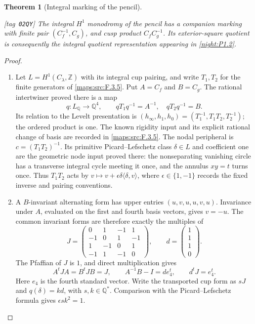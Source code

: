 \documentclass[11pt,a4paper]{article}
\numberwithin{equation}{section}
\newtheorem{theorem}{Theorem}[section]
\theoremstyle{definition}
\newcommand{\StatementRecord}[4]{{\upshape\footnotesize[tag~\texttt{#3}]}\enspace\ignorespaces}
\begin{document}
\begin{theorem}[Integral marking of the pencil]\hypertarget{tag-02QY}{}\label{night:P1.7}
\StatementRecord{night:P1.7}{proved}{02QY}{\cref{maps:src:F.3.5}, \cref{night:P1.2}}
The integral $H^1$ monodromy of the pencil has a companion marking with
finite pair $(C_f^{-1},C_g)$, and cusp product $C_fC_g^{-1}$.
Its exterior-square quotient is consequently the integral quotient
representation appearing in \cref{night:P1.2}.
\end{theorem}
\begin{proof}
\begin{enumerate}[label=\arabic*.]
\item Let $L=H^1(C_\lambda,\mathbb Z)$ with its integral cup pairing,
and write $T_1,T_2$ for the finite generators of
\cref{maps:src:F.3.5}. Put $A=C_f$ and $B=C_g$.
The rational intertwiner proved there is a map
\[
 q:L_{\mathbb Q}\longrightarrow\mathbb Q^4,
 \qquad qT_1q^{-1}=A^{-1},\quad qT_2q^{-1}=B.
\]
Its relation to the Levelt presentation is
$(h_\infty,h_1,h_0)=(T_1^{-1},T_1T_2,T_2^{-1})$;
the ordered product is one. The known rigidity input and its explicit
rational change of basis are recorded in \cref{maps:src:F.3.5}.
The nodal peripheral is $c=(T_1T_2)^{-1}$. Its primitive
Picard--Lefschetz class $\delta\in L$ and coefficient one are the
geometric node input proved there: the nonseparating vanishing circle
has a transverse integral cycle meeting it once, and the annulus
$xy=t$ turns once. Thus $T_1T_2$ acts by
$v\mapsto v+\epsilon\delta\langle\delta,v\rangle$,
where $\epsilon\in\{1,-1\}$ records the fixed inverse and pairing
conventions.

\item A $B$-invariant alternating form has upper entries
$(u,v,u,u,v,u)$. Invariance under $A$, evaluated on the first and
fourth basis vectors, gives $v=-u$. The common invariant forms are
therefore exactly the multiples of
\[
 J=\begin{pmatrix}
 0&1&-1&1\\-1&0&1&-1\\1&-1&0&1\\-1&1&-1&0
 \end{pmatrix},\qquad
 d=\begin{pmatrix}1\\1\\1\\0\end{pmatrix}.
\]
The Pfaffian of $J$ is $1$, and direct multiplication gives
\[
 A^tJA=B^tJB=J,\qquad
 A^{-1}B-I=d e_4^t,\qquad d^tJ=e_4^t.
\]
Here $e_4$ is the fourth standard vector. Write the transported cup
form as $sJ$ and $q(\delta)=k d$, with $s,k\in\mathbb Q^*$.
Comparison with the Picard--Lefschetz formula gives
$\epsilon s k^2=1$.


\end{enumerate}
\end{proof}
\end{document}
